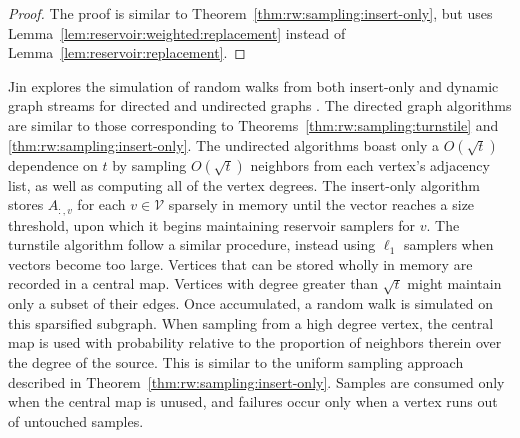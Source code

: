 \documentclass[10]{report}
\begin{document}
\begin{proof}
The proof is similar to Theorem~\ref{thm:rw:sampling:insert-only}, but uses Lemma~\ref{lem:reservoir:weighted:replacement} instead of Lemma~\ref{lem:reservoir:replacement}.
\end{proof}


Jin explores the simulation of random walks from both insert-only and dynamic graph streams for directed and undirected graphs \cite{jin2018simulating}.
The directed graph algorithms are similar to those corresponding to Theorems~\ref{thm:rw:sampling:turnstile} and \ref{thm:rw:sampling:insert-only}.
The undirected algorithms boast only a $O(\sqrt{t})$ dependence on $t$ by sampling $O(\sqrt{t})$ neighbors from each vertex's adjacency list, as well as computing all of the vertex degrees.
The insert-only algorithm stores $A_{:,v}$ for each $v \in \mathcal{V}$ sparsely in memory until the vector reaches a size threshold, upon which it begins maintaining reservoir samplers for $v$.
The turnstile algorithm follow a similar procedure, instead using $\ell_1$ samplers when vectors become too large.
Vertices that can be stored wholly in memory are recorded in a central map.
Vertices with degree greater than $\sqrt{t}$ might maintain only a subset of their edges. 
Once accumulated, a random walk is simulated on this sparsified subgraph.
When sampling from a high degree vertex, the central map is used with probability relative to the proportion of neighbors therein over the degree of the source.
This is similar to the uniform sampling approach described in Theorem~\ref{thm:rw:sampling:insert-only}.
Samples are consumed only when the central map is unused, and failures occur only when a vertex runs out of untouched samples.

\end{document}
